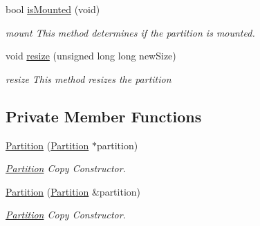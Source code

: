 \begin{DoxyCompactItemize}
bool \mbox{\hyperlink{classcore_1_1logic_1_1_partition_a2278f8791ff716985ea54bd61470d96f}{is\+Mounted}} (void)
\begin{DoxyCompactList}\small\item\em mount This method determines if the partition is mounted. \end{DoxyCompactList}\item 
void \mbox{\hyperlink{classcore_1_1logic_1_1_partition_ab7b1a0f3847b9117a284cf4022e05e88}{resize}} (unsigned long long new\+Size)
\begin{DoxyCompactList}\small\item\em resize This method resizes the partition \end{DoxyCompactList}\end{DoxyCompactItemize}
\subsection*{Private Member Functions}
\begin{DoxyCompactItemize}
\item 
\mbox{\hyperlink{classcore_1_1logic_1_1_partition_acb291b3b0ccf48005e141be32fdd7efd}{Partition}} (\mbox{\hyperlink{classcore_1_1logic_1_1_partition}{Partition}} $\ast$partition)
\begin{DoxyCompactList}\small\item\em \mbox{\hyperlink{classcore_1_1logic_1_1_partition}{Partition}} Copy Constructor. \end{DoxyCompactList}\item 
\mbox{\hyperlink{classcore_1_1logic_1_1_partition_a019dc9e3d0c13954cd5d72f2049f21fd}{Partition}} (\mbox{\hyperlink{classcore_1_1logic_1_1_partition}{Partition}} \&partition)
\begin{DoxyCompactList}\small\item\em \mbox{\hyperlink{classcore_1_1logic_1_1_partition}{Partition}} Copy Constructor. \end{DoxyCompactList}\end{DoxyCompactItemize}

